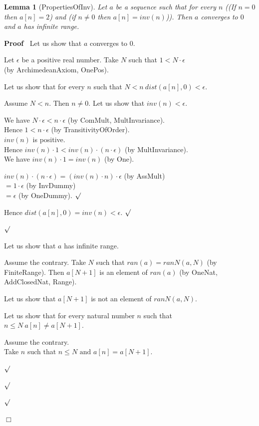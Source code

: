 \documentclass{article}
\newenvironment{forthel}{\begin{leftbar}}{\end{leftbar}}
\newenvironment{proof}{\noindent\textbf{Proof\ }}{\hspace*{\fill}$\Box$\medskip}
\newenvironment{subproof}{\begin{list}{}{}
		\item[\text{Proof}]}{\hfill $\surd$ \end{list}}
\newtheorem{lemma}{Lemma}
\newcommand{\dotequal}{=}
\begin{document}
\begin{forthel}
	\begin{lemma}[PropertiesOfInv]
		Let $a$ be a sequence such that for every $n$
		((If $n = 0$ then $a[n] = 2$) and (if $n \neq 0$ then $a[n] = inv(n)$)).
		Then $a$ converges to $0$ and $a$ has infinite range.
	\end{lemma}
	\begin{proof}
		Let us show that $a$ converges to $0$.
		\begin{subproof}
			Let $\epsilon$ be a positive real number. 
			Take $N$ such that $1 < N \cdot \epsilon$ \\(by ArchimedeanAxiom, OnePos).
	
			Let us show that for every $n$ such that $N < n \ dist(a[n],0) < \epsilon$.
			\begin{subproof}
				Assume $N < n$. Then $n \neq 0$.
				Let us show that $inv(n) < \epsilon$.
				\begin{subproof}
					We have $N \cdot \epsilon < n \cdot \epsilon$ (by ComMult, MultInvariance).\\
					Hence $1 < n \cdot \epsilon$ (by TransitivityOfOrder).\\
					$inv(n)$ is positive.\\
					Hence $inv(n) \cdot 1 < inv(n) \cdot (n \cdot \epsilon)$ (by MultInvariance).\\
					We have $inv(n) \cdot 1 = inv(n)$ (by One).
				
					$inv(n) \cdot (n \cdot \epsilon) \dotequal (inv(n) \cdot n) \cdot \epsilon$ (by AssMult)\\
					$\dotequal 1 \cdot \epsilon$ (by InvDummy)\\
					$\dotequal \epsilon$ (by OneDummy).
				\end{subproof}
				Hence $dist(a[n],0) = inv(n) < \epsilon$.
			\end{subproof}
		\end{subproof}
		Let us show that $a$ has infinite range.
		\begin{subproof}
			Assume the contrary.
			Take $N$ such that $ran(a) = ranN(a,N)$ \linebreak(by FiniteRange).
			Then $a[N + 1]$ is an element of $ran(a)$ (by OneNat, AddClosedNat, Range).
			
			Let us show that $a[N + 1]$ is not an element of $ranN(a,N)$.
			\begin{subproof}
				Let us show that for every natural number $n$ such that \\$n \leq N \ a[n] \neq a[N + 1]$.
				\begin{subproof}
					Assume the contrary.\\
					Take $n$ such that $n \leq N \text{ and } a[n] = a[N + 1]$.
					

\end{subproof}
\end{subproof}
\end{subproof}
\end{proof}
\end{forthel}
\end{document}
